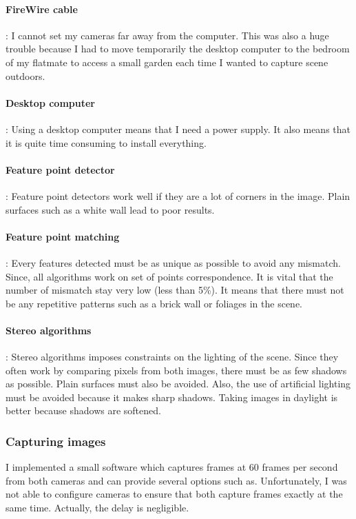 \documentclass[12pt]{article}
\begin{document}
\paragraph{FireWire cable}: I cannot set my cameras far away from the computer. This was also a huge trouble because I had to move temporarily the desktop computer to the bedroom of my flatmate to access a small garden each time I wanted to capture scene outdoors.
\paragraph{Desktop computer}: Using a desktop computer means that I need a power supply. It also means that it is quite time consuming to install everything.
\paragraph{Feature point detector}: Feature point detectors work well if they are a lot of corners in the image. Plain surfaces such as a white wall lead to poor results.
\paragraph{Feature point matching}: Every features detected must be as unique as possible to avoid any mismatch. Since, all algorithms work on set of points correspondence. It is vital that the number of mismatch stay very low (less than 5\%). It means that there must not be any repetitive patterns such as a brick wall or foliages in the scene.
\paragraph{Stereo algorithms}: Stereo algorithms imposes constraints on the lighting of the scene. Since they often work by comparing pixels from both images, there must be as few shadows as possible. Plain surfaces must also be avoided. Also, the use of artificial lighting must be avoided because it makes sharp shadows. Taking images in daylight is better because shadows are softened.

\subsubsection{Capturing images}

I implemented a small software which captures frames at 60 frames per second from both cameras and can provide several options such as. Unfortunately, I was not able to configure cameras to ensure that both capture frames exactly at the same time. Actually, the delay is negligible.
\end{document}
